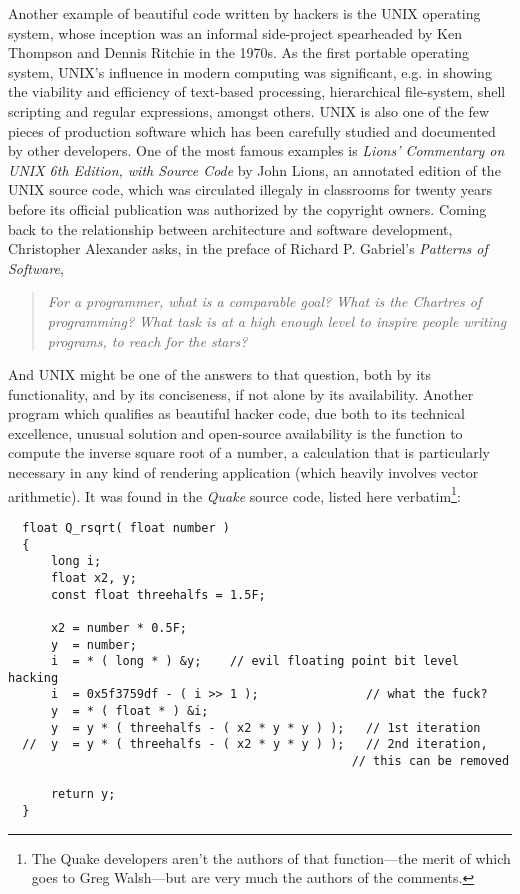 Another example of beautiful code written by hackers is the UNIX operating system, whose inception was an informal side-project spearheaded by Ken Thompson and Dennis Ritchie in the 1970s. As the first portable operating system, UNIX's influence in modern computing was significant, e.g. in showing the viability and efficiency of text-based processing, hierarchical file-system, shell scripting and regular expressions, amongst others. UNIX is also one of the few pieces of production software which has been carefully studied and documented by other developers. One of the most famous examples is \emph{Lions' Commentary on UNIX 6th Edition, with Source Code} by John Lions, an annotated edition of the UNIX source code, which was circulated illegaly in classrooms for twenty years before its official publication was authorized by the copyright owners\cite{lions_lions_1996}. Coming back to the relationship between architecture and software development, Christopher Alexander asks, in the preface of Richard P. Gabriel's \textit{Patterns of Software}\cite{gabriel_patterns_1998},

\begin{quote}
    \textit{For a programmer, what is a comparable goal? What is the Chartres of programming? What task is at a high enough level to inspire people writing programs, to reach for the stars?}
\end{quote}

And UNIX might be one of the answers to that question, both by its functionality, and by its conciseness, if not alone by its availability. Another program which qualifies as beautiful hacker code, due both to its technical excellence, unusual solution and open-source availability is the function to compute the inverse square root of a number, a calculation that is particularly necessary in any kind of rendering application (which heavily involves vector arithmetic). It was found in the \emph{Quake} source code, listed here verbatim\footnote{The Quake developers aren't the authors of that function—the merit of which goes to Greg Walsh—but are very much the authors of the comments.}:

\pagebreak

\begin{lstlisting}
  float Q_rsqrt( float number )
  {
      long i;
      float x2, y;
      const float threehalfs = 1.5F;

      x2 = number * 0.5F;
      y  = number;
      i  = * ( long * ) &y;    // evil floating point bit level hacking
      i  = 0x5f3759df - ( i >> 1 );               // what the fuck? 
      y  = * ( float * ) &i;
      y  = y * ( threehalfs - ( x2 * y * y ) );   // 1st iteration
  //  y  = y * ( threehalfs - ( x2 * y * y ) );   // 2nd iteration,
                                                // this can be removed

      return y;
  }
\end{lstlisting}

